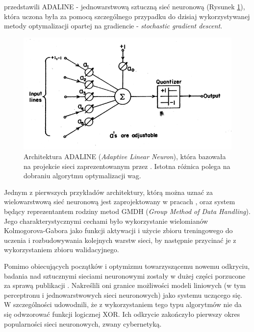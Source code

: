\documentclass[12pt,a4paper,twoside]{article}
\begin{document}
\citet{widrow1960} przedstawili ADALINE - jednowarstwową sztuczną sieć neuronową (Rysunek \ref{fig:ADALINE}), która uczona była za pomocą szczególnego przypadku do dzisiaj wykorzystywanej metody optymalizacji opartej na gradiencie - \textit{stochastic gradient descent}.

\begin{figure}[h]
  \centering
\includegraphics[scale=0.5]{../obrazy/fig:ADALINE.png}
\caption{Architektura ADALINE (\textit{Adaptive Linear Neuron}), która bazowała na projekcie sieci zaprezentowanym przez \citet{mcculloch1943}. Istotna różnica polega na dobraniu algorytmu optymalizacji wag. \label{fig:ADALINE}}
\end{figure}

Jednym z pierwszych przykładów architektury, którą można uznać za wielowarstwową sieć neuronową jest zaprojektowany w pracach \citet{ivakhnenko1965}, \citet{ivakhnenko1967} oraz \citet{ivakhnenko1968} system będący reprezentantem rodziny metod GMDH (\textit{Group Method of Data Handling}). Jego charakterystycznymi cechami było wykorzystanie wielomianów Kolmogorova-Gabora jako funkcji aktywacji i użycie zbioru treningowego do uczenia i rozbudowywania kolejnych warstw sieci, by następnie przycinać je z wykorzystaniem zbioru walidacyjnego.

Pomimo obiecujących początków i optymizmu towarzyszącemu nowemu odkryciu, badania nad sztucznymi sieciami neuronowymi zostały w dużej części porzucone za sprawą publikacji \citet{minsky1969}. Nakreślili oni granice możliwości modeli liniowych (w tym perceptronu i jednowarstwowych sieci neuronowych) jako systemu uczącego się. W szczególności udowodnili, że z wykorzystaniem tego typu algorytmów nie da się odwzorować funkcji logicznej XOR. Ich odkrycie zakończyło pierwszy okres popularności sieci neuronowych, zwany cybernetyką.
\end{document}
